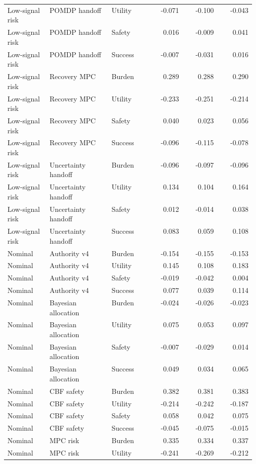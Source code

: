 \documentclass{article}
\begin{document}
\begin{center}
\begin{longtable}{p{0.17\linewidth}p{0.25\linewidth}p{0.16\linewidth}rrr}
Low-signal risk & POMDP handoff & Utility & -0.071 & -0.100 & -0.043\\
Low-signal risk & POMDP handoff & Safety & 0.016 & -0.009 & 0.041\\
Low-signal risk & POMDP handoff & Success & -0.007 & -0.031 & 0.016\\
Low-signal risk & Recovery MPC & Burden & 0.289 & 0.288 & 0.290\\
Low-signal risk & Recovery MPC & Utility & -0.233 & -0.251 & -0.214\\
Low-signal risk & Recovery MPC & Safety & 0.040 & 0.023 & 0.056\\
Low-signal risk & Recovery MPC & Success & -0.096 & -0.115 & -0.078\\
Low-signal risk & Uncertainty handoff & Burden & -0.096 & -0.097 & -0.096\\
Low-signal risk & Uncertainty handoff & Utility & 0.134 & 0.104 & 0.164\\
Low-signal risk & Uncertainty handoff & Safety & 0.012 & -0.014 & 0.038\\
Low-signal risk & Uncertainty handoff & Success & 0.083 & 0.059 & 0.108\\
Nominal & Authority v4 & Burden & -0.154 & -0.155 & -0.153\\
Nominal & Authority v4 & Utility & 0.145 & 0.108 & 0.183\\
Nominal & Authority v4 & Safety & -0.019 & -0.042 & 0.004\\
Nominal & Authority v4 & Success & 0.077 & 0.039 & 0.114\\
Nominal & Bayesian allocation & Burden & -0.024 & -0.026 & -0.023\\
Nominal & Bayesian allocation & Utility & 0.075 & 0.053 & 0.097\\
Nominal & Bayesian allocation & Safety & -0.007 & -0.029 & 0.014\\
Nominal & Bayesian allocation & Success & 0.049 & 0.034 & 0.065\\
Nominal & CBF safety & Burden & 0.382 & 0.381 & 0.383\\
Nominal & CBF safety & Utility & -0.214 & -0.242 & -0.187\\
Nominal & CBF safety & Safety & 0.058 & 0.042 & 0.075\\
Nominal & CBF safety & Success & -0.045 & -0.075 & -0.015\\
Nominal & MPC risk & Burden & 0.335 & 0.334 & 0.337\\
Nominal & MPC risk & Utility & -0.241 & -0.269 & -0.212\\

\end{longtable}
\end{center}
\end{document}
